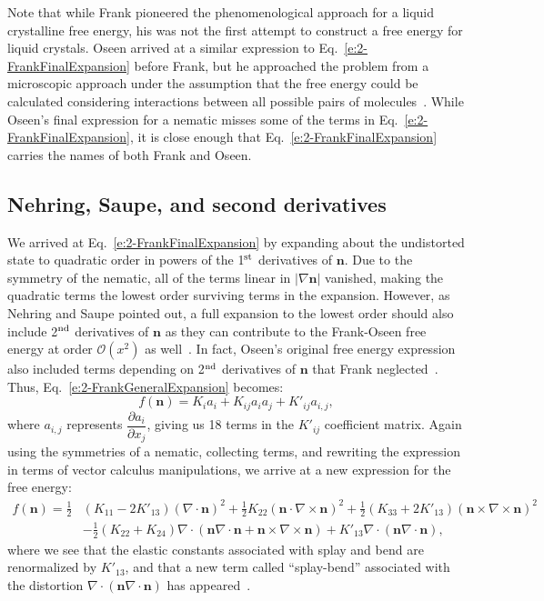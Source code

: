 Note that while Frank pioneered the phenomenological approach for a liquid crystalline free energy, his was not the first attempt to construct a free energy for liquid crystals.
Oseen arrived at a similar expression to Eq.~\ref{e:2-FrankFinalExpansion} before Frank, but he approached the problem from a microscopic approach under the assumption that the free energy could be calculated considering interactions between all possible pairs of molecules~\cite{RN205}.
While Oseen's final expression for a nematic misses some of the terms in Eq.~\ref{e:2-FrankFinalExpansion}, it is close enough that Eq.~\ref{e:2-FrankFinalExpansion} carries the names of both Frank and Oseen.


\subsection{Nehring, Saupe, and second derivatives}
We arrived at Eq.~\ref{e:2-FrankFinalExpansion} by expanding about the undistorted state to quadratic order in powers of the 1$^\textup{\rm st}$ derivatives of $\mathbf{n}$.
Due to the symmetry of the nematic, all of the terms linear in $|\nabla \mathbf{n}|$ vanished, making the quadratic terms the lowest order surviving terms in the expansion.
However, as Nehring and Saupe pointed out, a full expansion to the lowest order should also include 2$^\textup{\rm nd}$ derivatives of $\mathbf{n}$ as they can contribute to the Frank-Oseen free energy at order $\mathcal{O}(x^2)$ as well~\cite{RN60}.
In fact, Oseen's original free energy expression also included terms depending on 2$^\textup{\rm nd}$ derivatives of $\mathbf{n}$ that Frank neglected~\cite{RN205}.
Thus, Eq.~\ref{e:2-FrankGeneralExpansion} becomes:
\begin{equation}
  f(\mathbf{n}) = K_i a_i + K_{ij} a_i a_j + K'_{ij} a_{i,j},\label{e:2-NSGeneralExpansion}
\end{equation}
where $a_{i,j}$ represents $\dfrac{\partial a_i}{\partial x_j}$, giving us 18 terms in the $K'_{ij}$ coefficient matrix.
Again using the symmetries of a nematic, collecting terms, and rewriting the expression in terms of vector calculus manipulations, we arrive at a new expression for the free energy:
\begin{align}
  f(\mathbf{n}) = \frac{1}{2}&(K_{11} - 2K'_{13}) (\nabla \cdot \mathbf{n})^2 + \frac{1}{2}K_{22} (\mathbf{n} \cdot \nabla \times \mathbf{n})^2 + \frac{1}{2}(K_{33} + 2K'_{13}) (\mathbf{n} \times \nabla \times \mathbf{n})^2 \nonumber \\
    & - \frac{1}{2}(K_{22} + K_{24}) \nabla \cdot (\mathbf{n}\nabla \cdot \mathbf{n} + \mathbf{n} \times \nabla \times \mathbf{n})
      + K'_{13} \nabla \cdot (\mathbf{n} \nabla \cdot \mathbf{n}),\label{e:2-NSFinalExpansion}
\end{align}
where we see that the elastic constants associated with splay and bend are renormalized by $K'_{13}$, and that a new term called ``splay-bend'' associated with the distortion $\nabla \cdot (\mathbf{n} \nabla \cdot \mathbf{n})$ has appeared~\cite{RN60}. \\


